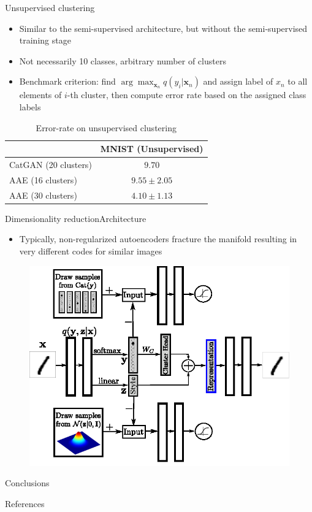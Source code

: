 \documentclass[10pt]{beamer}
\newcommand{\vect}[1]{\boldsymbol{#1}} %
\begin{document}
\begin{frame}{Unsupervised clustering}
\begin{itemize}
  \item Similar to the semi-supervised architecture, but without the semi-supervised training stage
  \item Not necessarily 10 classes, arbitrary number of clusters
  \item Benchmark criterion: find $ \arg\max_{\vect{x}_n} q(y_i | \vect x_n)  $ and assign label of $ x_n $ to all elements of $ i $-th cluster, then compute error rate based on the assigned class labels
\end{itemize}
\begin{table}
  \centering
  \small
  \begin{tabular}{l || c}
  	\toprule
  	                     & MNIST (Unsupervised) \\ \midrule
  	CatGAN (20 clusters) & $ 9.70 $             \\
  	AAE (16 clusters)    & $ 9.55 \pm 2.05 $    \\
  	AAE (30 clusters)    & $ 4.10 \pm 1.13 $    \\ \bottomrule
  \end{tabular}
  \caption{Error-rate on unsupervised clustering}
\end{table}
\end{frame}

\begin{frame}{Dimensionality reduction}{Architecture}
\begin{itemize}
  \item Typically, non-regularized autoencoders fracture the manifold resulting in very different codes for similar images
\end{itemize}
\begin{figure}
  \centering
  \includegraphics[width=0.6\linewidth]{../images/aae-architecture-04.png}
\end{figure}
\end{frame}

\begin{frame}{Conclusions}
\end{frame}

\begin{frame}{References}
\nocite{bengio2013better}
\nocite{bengio2014deep}
\nocite{goodfellow2014generative}
\nocite{kingma2013auto}
\printbibliography
\end{frame}
\end{document}

